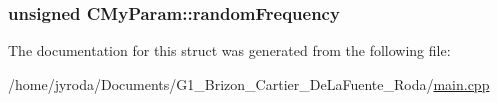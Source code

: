 \subsubsection[{\texorpdfstring{random\+Frequency}{randomFrequency}}]{\setlength{\rightskip}{0pt plus 5cm}unsigned C\+My\+Param\+::random\+Frequency}\hypertarget{struct_c_my_param_a7492c88f87a6eb26f15c7e4008c38519}{}\label{struct_c_my_param_a7492c88f87a6eb26f15c7e4008c38519}


The documentation for this struct was generated from the following file\+:\begin{DoxyCompactItemize}
\item 
/home/jyroda/\+Documents/\+G1\+\_\+\+Brizon\+\_\+\+Cartier\+\_\+\+De\+La\+Fuente\+\_\+\+Roda/\hyperlink{main_8cpp}{main.\+cpp}\end{DoxyCompactItemize}
